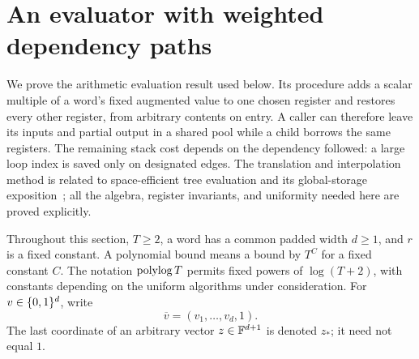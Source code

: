 \section{An evaluator with weighted dependency paths}\label{sec:evaluation}

We prove the arithmetic evaluation result used below.  Its procedure adds a
scalar multiple of a word's fixed augmented value to one chosen register and
restores every other register, from arbitrary contents on entry.  A caller can
therefore leave its inputs and partial output in a shared pool while a child
borrows the same registers.  The remaining stack cost depends on the
dependency followed: a large loop index is saved only on designated edges.
The translation and interpolation method is related to space-efficient tree
evaluation and its global-storage exposition~\cite{CookMertz2024,Goldreich2024}; all the algebra, register invariants, and
uniformity needed here are proved explicitly.

Throughout this section, $T\ge2$, a word has a common padded width $d\ge1$,
and $r$ is a fixed constant.  A polynomial bound means a bound by $T^C$ for a
fixed constant $C$.  The notation $\operatorname{polylog} T$ permits fixed powers of
$\log(T+2)$, with constants depending on the uniform algorithms under
consideration.  For $v\in\{0,1\}^d$, write
\[
 \overline v=(v_1,\ldots,v_d,1).
\]
The last coordinate of an arbitrary vector $z\in\mathbb F^{d+1}$ is denoted $z_*$;
it need not equal $1$.

